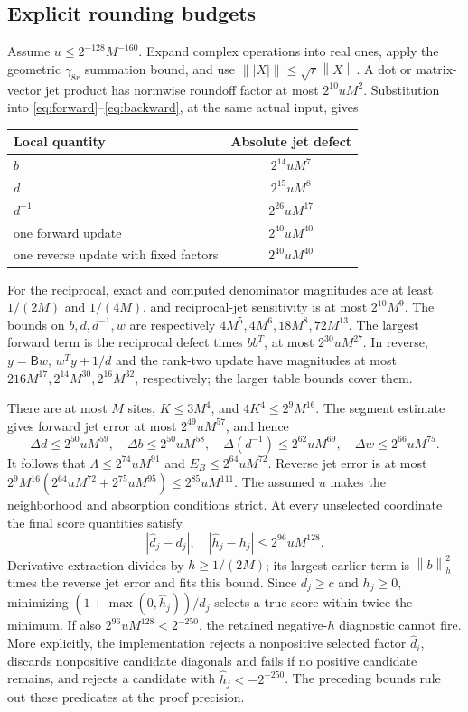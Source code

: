 \documentclass[11pt]{article}
\theoremstyle{remark}\newtheorem{remark}[theorem]{Remark}
\newcommand{\norm}[1]{\left\lVert#1\right\rVert}
\newcommand{\abs}[1]{\left\lvert#1\right\rvert}
\begin{document}
\subsection{Explicit rounding budgets}
Assume $u\le2^{-128}M^{-160}$. Expand complex operations into real ones,
apply the geometric $\gamma_{8r}$ summation bound, and use
$\norm{\abs X}\le\sqrt r\norm X$. A dot or matrix-vector jet product has
normwise roundoff factor at most $2^{10}uM^2$. Substitution into
\eqref{eq:forward}--\eqref{eq:backward}, at the same actual input, gives
\begin{center}
\begin{tabular}{lc}\toprule
Local quantity & Absolute jet defect\\\midrule
$b$ & $2^{14}uM^7$\\
$d$ & $2^{15}uM^8$\\
$d^{-1}$ & $2^{26}uM^{17}$\\
one forward update & $2^{40}uM^{40}$\\
one reverse update with fixed factors & $2^{40}uM^{40}$\\\bottomrule
\end{tabular}
\end{center}
For the reciprocal, exact and computed denominator magnitudes are at least
$1/(2M)$ and $1/(4M)$, and reciprocal-jet sensitivity is at most $2^{10}M^9$.
The bounds on $b,d,d^{-1},w$ are respectively
$4M^5,4M^6,18M^8,72M^{13}$. The largest forward term is the reciprocal
defect times $bb^T$, at most $2^{30}uM^{27}$. In reverse, $y=\mathsf B w$,
$w^Ty+1/d$ and the rank-two update have magnitudes at most
$216M^{17},2^{14}M^{30},2^{16}M^{32}$, respectively; the larger table
bounds cover them.

There are at most $M$ sites, $K\le3M^4$, and $4K^4\le2^9M^{16}$.
The segment estimate gives forward jet error at most $2^{49}uM^{57}$,
and hence
\[
 \Delta d\le2^{50}uM^{59},\quad \Delta b\le2^{50}uM^{58},\quad
 \Delta(d^{-1})\le2^{62}uM^{69},\quad \Delta w\le2^{66}uM^{75}.
\]
It follows that $\Lambda\le2^{74}uM^{91}$ and $E_B\le2^{64}uM^{72}$.
Reverse jet error is at most
$2^9M^{16}(2^{64}uM^{72}+2^{75}uM^{95})\le2^{85}uM^{111}$.
The assumed $u$ makes the neighborhood and absorption conditions strict.
At every unselected coordinate the final score quantities satisfy
\begin{equation}\label{eq:scoreerr}
 \abs{\widehat d_j-d_j},\quad\abs{\widehat h_j-h_j}
       \le2^{96}uM^{128}.
\end{equation}
Derivative extraction divides by $h\ge1/(2M)$; its largest earlier term is
$\norm b_h^2$ times the reverse jet error and fits this bound. Since
$d_j\ge c$ and $h_j\ge0$, minimizing
$(1+\max(0,\widehat h_j))/\widehat d_j$ selects a true score within twice
the minimum. If also $2^{96}uM^{128}<2^{-250}$, the retained negative-$h$
diagnostic cannot fire. More explicitly, the implementation rejects a
nonpositive selected factor $\widehat d_i$, discards nonpositive
candidate diagonals and fails if no positive candidate remains, and
rejects a candidate with $\widehat h_j<-2^{-250}$. The preceding
bounds rule out these predicates at the proof precision.
\end{document}

